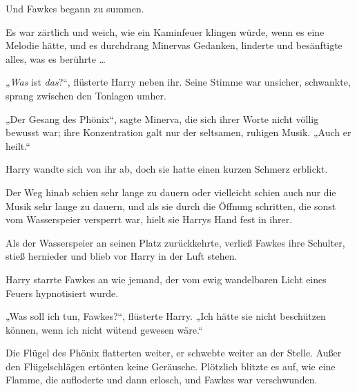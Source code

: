 Und Fawkes begann zu summen. 

Es war zärtlich und weich, wie ein Kaminfeuer klingen würde, wenn es eine Melodie hätte, und es durchdrang Minervas Gedanken, linderte und besänftigte alles, was es berührte … 

„\emph{Was} ist \emph{das}?“, flüsterte Harry neben ihr. Seine Stimme war unsicher, schwankte, sprang zwischen den Tonlagen umher. 

„Der Gesang des Phönix“, sagte Minerva, die sich ihrer Worte nicht völlig bewusst war; ihre Konzentration galt nur der seltsamen, ruhigen Musik. „Auch er heilt.“ 

Harry wandte sich von ihr ab, doch sie hatte einen kurzen Schmerz erblickt. 

Der Weg hinab schien sehr lange zu dauern oder vielleicht schien auch nur die Musik sehr lange zu dauern, und als sie durch die Öffnung schritten, die sonst vom Wasserspeier versperrt war, hielt sie Harrys Hand fest in ihrer. 

Als der Wasserspeier an seinen Platz zurückkehrte, verließ Fawkes ihre Schulter, stieß hernieder und blieb vor Harry in der Luft stehen. 

Harry starrte Fawkes an wie jemand, der vom ewig wandelbaren Licht eines Feuers hypnotisiert wurde. 

„Was soll ich tun, Fawkes?“, flüsterte Harry. „Ich hätte sie nicht beschützen können, wenn ich nicht wütend gewesen wäre.“ 

Die Flügel des Phönix flatterten weiter, er schwebte weiter an der Stelle. Außer den Flügelschlägen ertönten keine Geräusche. Plötzlich blitzte es auf, wie eine Flamme, die aufloderte und dann erlosch, und Fawkes war verschwunden. 

